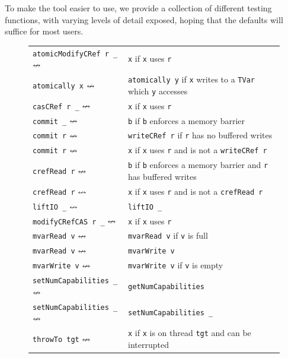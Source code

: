 To make the tool easier to use, we provide a collection of different
testing functions, with varying levels of detail exposed, hoping that
the defaults will suffice for most users.
\begin{figure}
  \centering
  \footnotesize
  \begin{tabular}{R{4cm}@{\hspace{0.5em}}L{8cm}}
    \texttt{atomicModifyCRef r \_} $\nleftrightarrow$& \texttt{x}
      \hfill if \texttt{x} uses \texttt{r} \\
    \texttt{atomically x} $\nleftrightarrow$& \texttt{atomically y}
      \hfill if \texttt{x} writes to a \texttt{TVar} which \texttt{y} accesses \\
    \texttt{casCRef r \_} $\nleftrightarrow$& \texttt{x}
      \hfill if \texttt{x} uses \texttt{r} \\
    \texttt{commit \_} $\nleftrightarrow$& \texttt{b}
      \hfill if \texttt{b} enforces a memory barrier \\
    \texttt{commit r} $\nleftrightarrow$& \texttt{writeCRef r}
      \hfill if \texttt{r} has no buffered writes \\
    \texttt{commit r} $\nleftrightarrow$& \texttt{x}
      \hfill if \texttt{x} uses \texttt{r} and is not a \texttt{writeCRef r} \\
    \texttt{crefRead r} $\nleftrightarrow$& \texttt{b}
      \hfill if \texttt{b} enforces a memory barrier and \texttt{r} has buffered writes \\
    \texttt{crefRead r} $\nleftrightarrow$& \texttt{x}
      \hfill if \texttt{x} uses \texttt{r} and is not a \texttt{crefRead r} \\
    \texttt{liftIO \_} $\nleftrightarrow$& \texttt{liftIO \_} \\
    \texttt{modifyCRefCAS r \_} $\nleftrightarrow$& \texttt{x}
      \hfill if \texttt{x} uses \texttt{r} \\
    \texttt{mvarRead v} $\nleftrightarrow$& \texttt{mvarRead v}
      \hfill if \texttt{v} is full \\
    \texttt{mvarRead v} $\nleftrightarrow$& \texttt{mvarWrite v} \\
    \texttt{mvarWrite v} $\nleftrightarrow$& \texttt{mvarWrite v}
      \hfill if \texttt{v} is empty \\
    \texttt{setNumCapabilities \_} $\nleftrightarrow$& \texttt{getNumCapabilities} \\
    \texttt{setNumCapabilities \_} $\nleftrightarrow$& \texttt{setNumCapabilities \_} \\
    \texttt{throwTo tgt} $\nleftrightarrow$& \texttt{x}
      \hfill if \texttt{x} is on thread \texttt{tgt} and can be interrupted \\

\end{tabular}
\end{figure}
